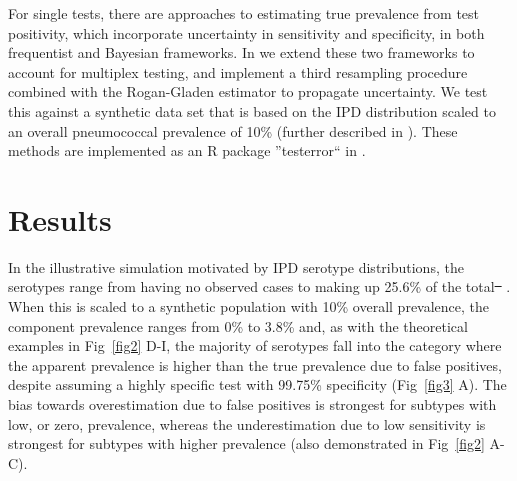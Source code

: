 \documentclass[10pt,letterpaper]{article}
\providecommand{\DIFaddtex}[1]{{\protect\color{blue}\uwave{#1}}} %
\providecommand{\DIFdeltex}[1]{{\protect\color{red}\sout{#1}}}                      %
\providecommand{\DIFaddbegin}{} %
\providecommand{\DIFaddend}{} %
\providecommand{\DIFdelbegin}{} %
\providecommand{\DIFdelend}{} %
\providecommand{\DIFadd}[1]{\texorpdfstring{\DIFaddtex{#1}}{#1}} %
\providecommand{\DIFdel}[1]{\texorpdfstring{\DIFdeltex{#1}}{}} %
\newcommand{\DIFscaledelfig}{0.5}
\newlength{\DIFdelgraphicswidth} %
\newlength{\DIFdelgraphicsheight} %
\newcommand{\DIFaddincludegraphics}[2][]{{\color{blue}\fbox{\DIFOincludegraphics[#1]{#2}}}} %
\newcommand{\DIFdelincludegraphics}[2][]{%
\sbox{\DIFdelgraphicsbox}{\DIFOincludegraphics[#1]{#2}}%
\settoboxwidth{\DIFdelgraphicswidth}{\DIFdelgraphicsbox} %
\settoboxtotalheight{\DIFdelgraphicsheight}{\DIFdelgraphicsbox} %
\scalebox{\DIFscaledelfig}{%
\parbox[b]{\DIFdelgraphicswidth}{\usebox{\DIFdelgraphicsbox}\\[-\baselineskip] \rule{\DIFdelgraphicswidth}{0em}}\llap{\resizebox{\DIFdelgraphicswidth}{\DIFdelgraphicsheight}{%
\setlength{\unitlength}{\DIFdelgraphicswidth}%
\begin{picture}(1,1)%
\thicklines\linethickness{2pt} %
{\color[rgb]{1,0,0}\put(0,0){\framebox(1,1){}}}%
{\color[rgb]{1,0,0}\put(0,0){\line( 1,1){1}}}%
{\color[rgb]{1,0,0}\put(0,1){\line(1,-1){1}}}%
\end{picture}%
}\hspace*{3pt}}} %
} %
\DeclareRobustCommand{\DIFaddbegin}{\DIFOaddbegin \let\includegraphics\DIFaddincludegraphics} %
\DeclareRobustCommand{\DIFaddend}{\DIFOaddend \let\includegraphics\DIFOincludegraphics} %
\DeclareRobustCommand{\DIFdelbegin}{\DIFOdelbegin \let\includegraphics\DIFdelincludegraphics} %
\DeclareRobustCommand{\DIFdelend}{\DIFOaddend \let\includegraphics\DIFOincludegraphics} %
\begin{document}
For single tests, there are approaches to estimating true prevalence from test positivity, which incorporate uncertainty in sensitivity and specificity, in both frequentist\cite{lang2014,thomas2022,flor2020} and Bayesian frameworks\cite{gelman2020,flor2020,diggle2011}. In  we extend these two frameworks to account for multiplex testing, and implement a third resampling procedure combined with the Rogan-Gladen estimator to propagate uncertainty. We test this against a synthetic data set that is based on the IPD distribution scaled to an overall pneumococcal prevalence of 10\% (further described in ). These methods are implemented as an R package ''testerror`` in .

\section*{Results}

In the illustrative simulation motivated by IPD serotype distributions, the serotypes range from having no observed cases to making up 25.6\% of the total\DIFdelbegin \DIFdel{\mbox{%
\cite{hyams2023a}}\hspace{0pt}%
}\DIFdelend \DIFaddbegin \DIFadd{\mbox{%
\cite{hyams2023}}\hspace{0pt}%
}\DIFaddend . When this is scaled to a synthetic population with 10\% overall prevalence, the component prevalence ranges from 0\% to 3.8\% and, as with the theoretical examples in Fig~\ref{fig2} D-I, the majority of serotypes fall into the category where the apparent prevalence is higher than the true prevalence due to false positives, despite assuming a highly specific test with 99.75\% specificity (Fig~\ref{fig3} A). The bias towards overestimation due to false positives is strongest for subtypes with low, or zero, prevalence, whereas the underestimation due to low sensitivity is strongest for subtypes with higher prevalence (also demonstrated in Fig~\ref{fig2} A-C).
\end{document}
